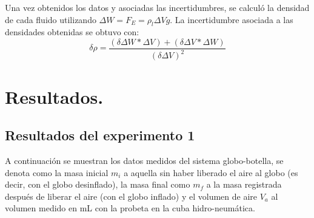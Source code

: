 \documentclass[a4paper]{article}
\begin{document}
Una vez obtenidos los datos y asociadas las incertidumbres, se calculó la densidad de cada fluido utilizando $\Delta W=F_{E}=\rho_{l}\Delta V g$. La incertidumbre asociada a las densidades obtenidas se obtuvo con: $$\delta \rho = \frac{(\delta \Delta W *\Delta V)+(\delta \Delta V *\Delta W)}{(\delta \Delta V)^{2}}$$

\section*{Resultados.}
\subsection*{Resultados del experimento 1}
A continuación se muestran los datos medidos del sistema globo-botella, se denota como la masa inicial $m_i$ a aquella sin haber liberado el aire al globo (es decir, con el globo desinflado), la masa final como $m_f$ a la masa registrada después de liberar el aire (con el globo inflado) y el volumen de aire $V_a$ al volumen medido en mL con la probeta en la cuba hidro-neumática.
\end{document}

